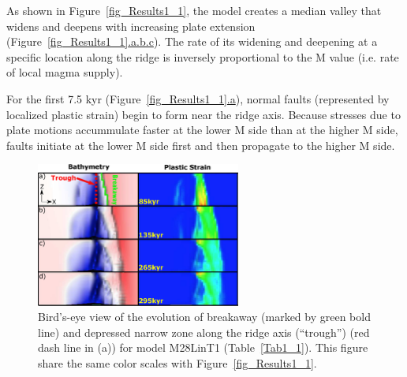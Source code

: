 As shown in Figure~\hyperref[fig_Results1_1]{\ref{fig_Results1_1}}, the model creates a median valley that widens and deepens with increasing plate extension (Figure~\hyperref[fig_Results1_1]{\ref{fig_Results1_1}.a.b.c}). The rate of its widening and deepening at a specific location along the ridge is inversely proportional to the M value (i.e. rate of local magma supply). %

For the first 7.5 kyr (Figure~\hyperref[fig_Results1_1]{\ref{fig_Results1_1}.a}), %
normal faults (represented by localized plastic strain) begin to form near the ridge axis.
Because stresses due to plate motions accummulate faster at the lower M side than at the higher M side, faults initiate at the lower M side first and then propagate to the higher M side.

\begin{figure}[h]
  \centering
    \includegraphics[width=0.6\textwidth]{./Figures/fig_Results1_4.eps}
  \caption{Bird's-eye view of the evolution of breakaway (marked by green bold line) and depressed narrow zone along the ridge axis (``trough'') (red dash line in (a)) for model M28LinT1 (Table~\hyperref[Tab1_1]{\ref{Tab1_1}}). This figure share the same color scales with Figure~\hyperref[fig_Results1_1]{\ref{fig_Results1_1}}.}
 \label{fig_Results1_4}
\end{figure}

